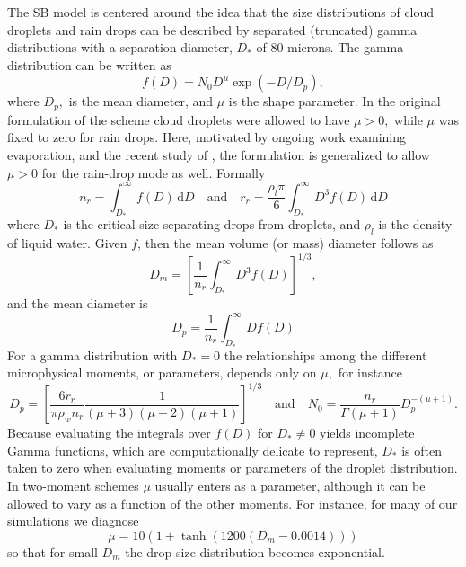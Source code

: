\documentclass[11pt,a4paper]{article}
\begin{document}
The SB model is centered around the idea that the size distributions
of cloud droplets and rain drops can be described by separated
(truncated) gamma distributions with a separation diameter, $D_*$ of
80 microns.  The gamma distribution can be written as
\begin{equation}
f(D) = N_0 D^\mu \exp(-D/D_p),
\end{equation}
where $D_p,$ is the mean diameter, and $\mu$ is the shape parameter.
In the original formulation of the scheme cloud droplets were allowed
to have $\mu>0,$ while $\mu$ was fixed to zero for rain drops.  Here,
motivated by ongoing work examining evaporation, and the recent study
of \cite{Milbr:2005}, the formulation is generalized to allow $\mu >
0$ for the rain-drop mode as well.  Formally
\begin{equation}
n_r = \int_{D_*}^\infty f(D) \, \mathrm{d}D \quad \text{and} \quad r_r
= \frac{\rho_l\pi}{6} \int_{D_*}^\infty D^3 f(D) \, \mathrm{d}D
\end{equation}
where $D_*$ is the critical size separating drops from droplets, and
$\rho_l$ is the density of liquid water.  Given $f$, then the mean
volume (or mass) diameter follows as
\begin{equation}
D_m = \left[ \frac{1}{n_r} \int_{D_*}^\infty D^3 f(D) \right]^{1/3},
\end{equation}
and the mean diameter is
\begin{equation}
D_p = \frac{1}{n_r} \int_{D_*}^\infty D f(D)
\end{equation}
For a gamma distribution with $D_*=0$ the relationships among the
different microphysical moments, or parameters, depends only on $\mu,$
for instance
\begin{equation}
D_p = [\frac{6r_r}{\pi\rho_w
n_r}\frac{1}{(\mu+3)(\mu+2)(\mu+1)}]^{1/3} \quad \text{and}\quad N_0 =
\frac{n_r}{\Gamma(\mu+1)} D_p^{-(\mu+1)}.
\end{equation}
Because evaluating the integrals over $f(D)$ for $D_*\ne0$ yields
incomplete Gamma functions, which are computationally delicate to
represent, $D_*$ is often taken to zero when evaluating moments or
parameters of the droplet distribution.  In two-moment schemes $\mu$
usually enters as a parameter, although it can be allowed to vary as a
function of the other moments.  For instance, for many of our
simulations we diagnose
\begin{equation}
 \mu = 10(1 + \tanh(1200(D_m - 0.0014))) \label{eq:mu}
\end{equation}
so that for small $D_m$ the drop size distribution becomes
exponential.
\end{document}
